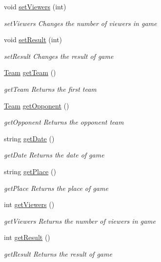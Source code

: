 \begin{DoxyCompactItemize}
void \hyperlink{class_game_a0f9a397e0d33e01f4f38d53b836bce93}{set\-Viewers} (int)
\begin{DoxyCompactList}\small\item\em set\-Viewers Changes the number of viewers in game \end{DoxyCompactList}\item 
void \hyperlink{class_game_adc319059775c5ec5c44bd67030586e63}{set\-Result} (int)
\begin{DoxyCompactList}\small\item\em set\-Result Changes the result of game \end{DoxyCompactList}\item 
\hyperlink{class_team}{Team} \hyperlink{class_game_ad10459ff803e165bc47f1f64cbf36d3e}{get\-Team} ()
\begin{DoxyCompactList}\small\item\em get\-Team Returns the first team \end{DoxyCompactList}\item 
\hyperlink{class_team}{Team} \hyperlink{class_game_a4c2f082a0293189f8d6b2431dc77dbd3}{get\-Opponent} ()
\begin{DoxyCompactList}\small\item\em get\-Opponent Returns the opponent team \end{DoxyCompactList}\item 
string \hyperlink{class_game_aa7575642514fb6365f59719f45d0544a}{get\-Date} ()
\begin{DoxyCompactList}\small\item\em get\-Date Returns the date of game \end{DoxyCompactList}\item 
string \hyperlink{class_game_a359c2b8115a6ff5a00840bea215cf70a}{get\-Place} ()
\begin{DoxyCompactList}\small\item\em get\-Place Returns the place of game \end{DoxyCompactList}\item 
int \hyperlink{class_game_add770566ae16c0b50d92ff0048db5959}{get\-Viewers} ()
\begin{DoxyCompactList}\small\item\em get\-Viewers Returns the number of viewers in game \end{DoxyCompactList}\item 
int \hyperlink{class_game_ac77104af065e2ace478c66a4388a5c17}{get\-Result} ()
\begin{DoxyCompactList}\small\item\em get\-Result Returns the result of game \end{DoxyCompactList}\end{DoxyCompactItemize}
